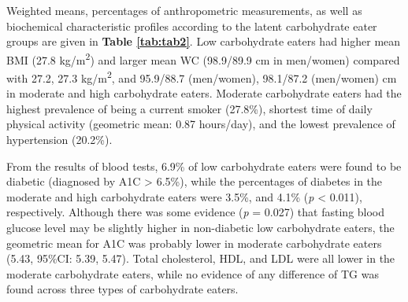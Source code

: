 Weighted means, percentages of anthropometric measurements, as well as biochemical characteristic profiles according to the latent carbohydrate eater groups are given in \textbf{Table \ref{tab:tab2}}. Low carbohydrate eaters had higher mean BMI (27.8 kg/m\textsuperscript{2}) and larger mean WC (98.9/89.9 cm in men/women) compared with 27.2, 27.3 kg/m\textsuperscript{2}, and 95.9/88.7 (men/women), 98.1/87.2 (men/women) cm in moderate and high carbohydrate eaters. Moderate carbohydrate eaters had the highest prevalence of being a current smoker (27.8\%), shortest time of daily physical activity (geometric mean: 0.87 hours/day), and the lowest prevalence of hypertension (20.2\%).

From the results of blood tests, 6.9\% of low carbohydrate eaters were found to be diabetic (diagnosed by A1C > 6.5\%), while the percentages of diabetes in the moderate and high carbohydrate eaters were 3.5\%, and 4.1\% (\textit{p} < 0.011), respectively. Although there was some evidence (\textit{p} = 0.027) that fasting blood glucose level may be slightly higher in non-diabetic low carbohydrate eaters, the geometric mean for A1C was probably lower in moderate carbohydrate eaters (5.43, 95\%CI: 5.39, 5.47). Total cholesterol, HDL, and LDL were all lower in the moderate carbohydrate eaters, while no evidence of any difference of TG was found across three types of carbohydrate eaters. 




